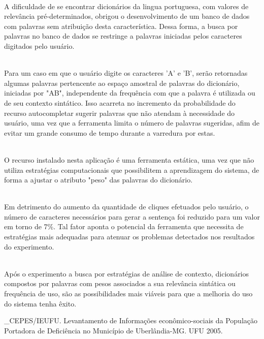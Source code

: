 \documentclass[twoside]{article}
\begin{document}
\begin{multicols}{2}
\noindent \\A dificuldade de se encontrar dicionários da lingua portuguesa, com valores de relevância pré-determinados, obrigou o desenvolvimento de um banco de dados com palavras sem atribuição desta característica. Dessa forma, a busca por palavras no banco de dados se restringe a palavras iniciadas pelos caracteres digitados pelo usuário. 

\noindent \\Para um caso em que o usuário digite os caracteres 'A' e 'B', serão retornadas algumas palavras pertencente ao espaço amostral de palavras do dicionário, iniciadas por "AB", independente da frequência com que a palavra é utilizada ou de seu contexto sintático. Isso acarreta no incremento da probabilidade do recurso autocompletar sugerir palavras que não atendam à necessidade do usuário, uma vez que a ferramenta limita o número de palavras sugeridas, afim de evitar um grande consumo de tempo durante a varredura por estas.

\noindent \\O recurso instalado nesta aplicação é uma ferramenta estática, uma vez que não utiliza estratégias computacionais que possibilitem a aprendizagem do sistema, de forma a ajustar o atributo "peso" das palavras do dicionário.

\noindent \\Em detrimento do aumento da quantidade de cliques efetuados pelo usuário, o número de caracteres necessários para gerar a sentença foi reduzido para um valor em torno de 7\%. Tal fator aponta o potencial da ferramenta que necessita de estratégias mais adequadas para atenuar os problemas detectados nos resultados do experimento.

\noindent \\Após o experimento a busca por estratégias de análise de contexto, dicionários compostos por palavras com pesos associados a sua relevância sintática ou frequência de uso, são as possibilidades mais viáveis para que a melhoria do uso do sistema tenha êxito.


\begin{thebibliography}{99} %

\bibitem _CEPES/IEUFU. Levantamento de Informações econômico-sociais da População Portadora de Deficiência no Município de Uberlândia-MG. UFU 2005.


\end{thebibliography}
\end{multicols}
\end{document}
